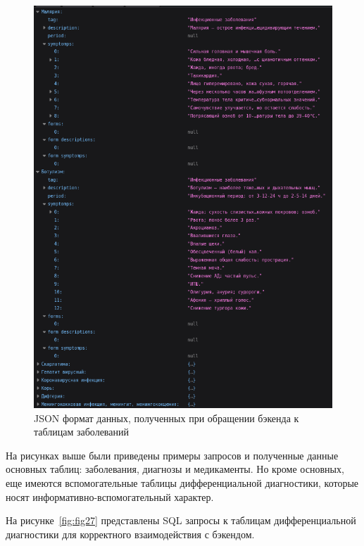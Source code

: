 \begin{figure}
  \includegraphics[scale=0.92]{inc/json_sh_dis_part_name2}
  \caption{JSON формат данных, полученных при обращении бэкенда к таблицам заболеваний}
  \label{fig:fig26}
\end{figure}

На рисунках выше были приведены примеры запросов и полученные данные основных таблиц: заболевания, диагнозы и медикаменты. Но кроме основных, еще имеются вспомогательные таблицы дифференциальной диагностики, которые носят информативно-вспомогательный характер.

На рисунке~\ref{fig:fig27} представлены SQL запросы к таблицам дифференциальной диагностики для корректного взаимодействия с бэкендом.

